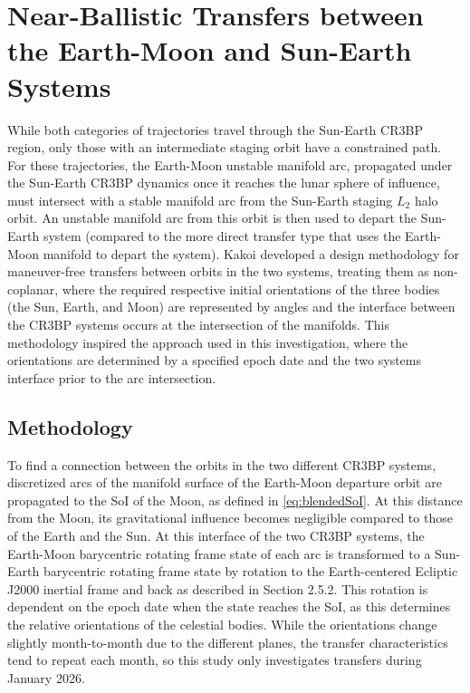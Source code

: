 \section{Near-Ballistic Transfers between the Earth-Moon and Sun-Earth Systems}
While both categories of trajectories travel through the Sun-Earth CR3BP region, only those with an
intermediate staging orbit have a constrained path. For these trajectories, the Earth-Moon unstable
manifold arc, propagated under the Sun-Earth CR3BP dynamics once it reaches the lunar sphere of
influence, must intersect with a stable manifold arc from the Sun-Earth staging $L_{2}$ halo orbit.
An unstable manifold arc from this orbit is then used to depart the Sun-Earth system (compared to
the more direct transfer type that uses the Earth-Moon manifold to depart the system). Kakoi
developed a design methodology for maneuver-free transfers between orbits in the two systems,
treating them as non-coplanar, where the required respective initial orientations of the three
bodies (the Sun, Earth, and Moon) are represented by angles and the interface between the CR3BP
systems occurs at the intersection of the manifolds\cite{Kakoi:2014,Kakoi:2015}. This methodology
inspired the approach used in this investigation, where the orientations are determined by a
specified epoch date and the two systems interface prior to the arc intersection.

\subsection{Methodology}
To find a connection between the orbits in the two different CR3BP systems, discretized arcs of the
manifold surface of the Earth-Moon departure orbit are propagated to the SoI of the Moon, as
defined in \cref{eq:blendedSoI}. At this distance from the Moon, its gravitational influence
becomes negligible compared to those of the Earth and the Sun. At this interface of the two CR3BP
systems, the Earth-Moon barycentric rotating frame state of each arc is transformed to a Sun-Earth
barycentric rotating frame state by rotation to the Earth-centered Ecliptic J2000 inertial frame
and back as described in Section 2.5.2. This rotation is dependent on the epoch date when the state
reaches the SoI, as this determines the relative orientations of the celestial bodies. While the
orientations change slightly month-to-month due to the different planes, the transfer
characteristics tend to repeat each month, so this study only investigates transfers during January
2026\cite{Parker:2013}.

